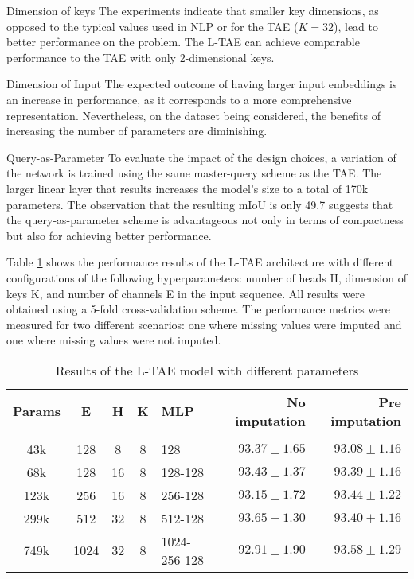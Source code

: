 \begin{paragraph} {Dimension of keys}
The experiments indicate that smaller key dimensions, as opposed to the typical values used in NLP or for the TAE ($K = 32$), lead to better performance on the problem.
The L-TAE can achieve comparable performance to the TAE with only 2-dimensional keys.
\end{paragraph}

\begin{paragraph} {Dimension of Input}
The expected outcome of having larger input embeddings is an increase in performance, as it corresponds to a more comprehensive representation.
Nevertheless, on the dataset being considered, the benefits of increasing the number of parameters are diminishing.
\end{paragraph}

\begin{paragraph} {Query-as-Parameter}
To evaluate the impact of the design choices, a variation of the network is trained using the same master-query scheme as the TAE.
The larger linear layer that results increases the model's size to a total of 170k parameters.
The observation that the resulting mIoU is only 49.7 suggests that the query-as-parameter scheme is advantageous not only in terms of compactness but also for achieving better performance.
\end{paragraph}

Table \ref{tab:LTAEresults} shows the performance results of the L-TAE architecture with different configurations of the following hyperparameters: number of heads H, dimension of keys K, and number of channels E in the input sequence.
All results were obtained using a 5-fold cross-validation scheme.
The performance metrics were measured for two different scenarios: one where missing values were imputed and one where missing values were not imputed.

\begin{table}[H]
  \centering
  \begin{tabular}{cccclrr} 
     Params & E & H & K & MLP & No imputation & Pre imputation\\[0.2cm] 
     \hline \\[-0.2cm] 
     43k & 	128 & 	8 & 	8 & 	128 & 	$93.37 \pm 1.65$ & 	$93.08 \pm 1.16$\\ 
     68k & 	128 & 	16 & 	8 & 	128-128 & 	$93.43 \pm 1.37$ & 	$93.39 \pm 1.16$\\ 
     123k & 	256 & 	16 & 	8 & 	256-128 & 	$93.15 \pm 1.72$ & 	$93.44 \pm 1.22$\\ 
     299k & 	512 & 	32 & 	8 & 	512-128 & 	$\mathbf{93.65 \pm 1.30}$ & 	$93.40 \pm 1.16$\\ 
     749k & 	1024 & 	32 & 	8 & 	1024-256-128 & 	$92.91 \pm 1.90$ & 	$\mathbf{93.58 \pm 1.29}$\\ 
  \end{tabular}
  \caption{Results of the L-TAE model with different parameters}
  \label{tab:LTAEresults}
\end{table}

